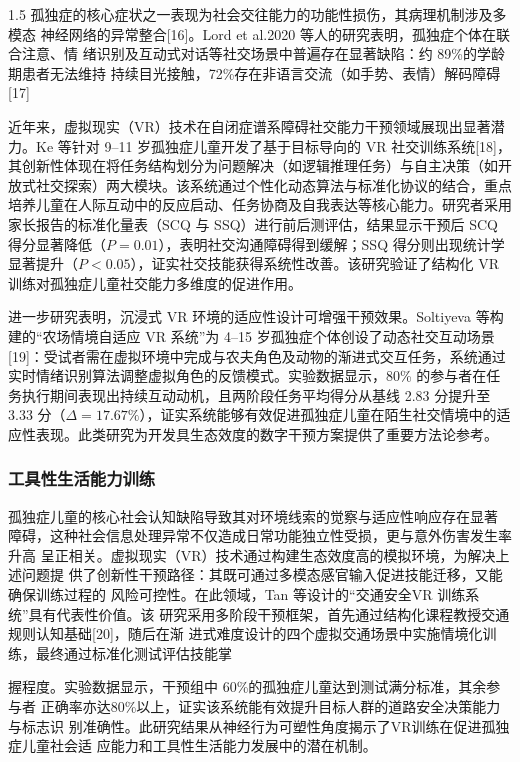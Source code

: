 \documentclass[zihao=-4]{ctexart}
\begin{document}
\begin{spacing}{1.5}
孤独症的核心症状之一表现为社会交往能力的功能性损伤，其病理机制涉及多模态 神经网络的异常整合[16]。Lord et al.2020 等人的研究表明，孤独症个体在联合注意、情 绪识别及互动式对话等社交场景中普遍存在显著缺陷：约 89\%的学龄期患者无法维持 持续目光接触，72\%存在非语言交流（如手势、表情）解码障碍[17]

近年来，虚拟现实（VR）技术在自闭症谱系障碍社交能力干预领域展现出显著潜力。Ke 等针对 9--11 岁孤独症儿童开发了基于目标导向的 VR 社交训练系统[18]，其创新性体现在将任务结构划分为问题解决（如逻辑推理任务）与自主决策（如开放式社交探索）两大模块。该系统通过个性化动态算法与标准化协议的结合，重点培养儿童在人际互动中的反应启动、任务协商及自我表达等核心能力。研究者采用家长报告的标准化量表（SCQ 与 SSQ）进行前后测评估，结果显示干预后 SCQ 得分显著降低（$P=0.01$），表明社交沟通障碍得到缓解；SSQ 得分则出现统计学显著提升（$P<0.05$），证实社交技能获得系统性改善。该研究验证了结构化 VR 训练对孤独症儿童社交能力多维度的促进作用。

进一步研究表明，沉浸式 VR 环境的适应性设计可增强干预效果。Soltiyeva 等构建的“农场情境自适应 VR 系统”为 4--15 岁孤独症个体创设了动态社交互动场景[19]：受试者需在虚拟环境中完成与农夫角色及动物的渐进式交互任务，系统通过实时情绪识别算法调整虚拟角色的反馈模式。实验数据显示，80\% 的参与者在任务执行期间表现出持续互动动机，且两阶段任务平均得分从基线 2.83 分提升至 3.33 分（$\Delta=17.67\%$），证实系统能够有效促进孤独症儿童在陌生社交情境中的适应性表现。此类研究为开发具生态效度的数字干预方案提供了重要方法论参考。

\subsubsection{工具性生活能力训练}

孤独症儿童的核心社会认知缺陷导致其对环境线索的觉察与适应性响应存在显著 障碍，这种社会信息处理异常不仅造成日常功能独立性受损，更与意外伤害发生率升高 呈正相关。虚拟现实（VR）技术通过构建生态效度高的模拟环境，为解决上述问题提 供了创新性干预路径：其既可通过多模态感官输入促进技能迁移，又能确保训练过程的 风险可控性。在此领域，Tan 等设计的“交通安全VR 训练系统”具有代表性价值。该 研究采用多阶段干预框架，首先通过结构化课程教授交通规则认知基础[20]，随后在渐 进式难度设计的四个虚拟交通场景中实施情境化训练，最终通过标准化测试评估技能掌


握程度。实验数据显示，干预组中 60\%的孤独症儿童达到测试满分标准，其余参与者 正确率亦达80\%以上，证实该系统能有效提升目标人群的道路安全决策能力与标志识 别准确性。此研究结果从神经行为可塑性角度揭示了VR训练在促进孤独症儿童社会适 应能力和工具性生活能力发展中的潜在机制。


\end{spacing}
\end{document}
